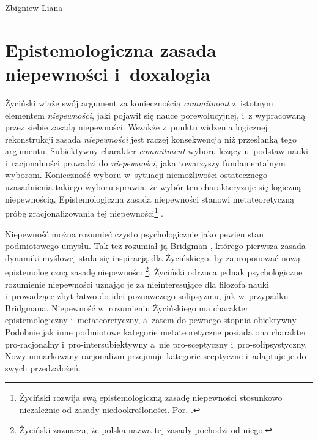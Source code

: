 \begin{artplenv}{Zbigniew Liana}
\section{Epistemologiczna zasada niepewności i~doxalogia}
Życiński wiąże swój argument za koniecznością \textit{commitment} z~istotnym elementem \textit{niepewności}, jaki pojawił się nauce porewolucyjnej, i~z wypracowaną przez siebie zasadą niepewności. Wszakże z~punktu widzenia logicznej rekonstrukcji zasada \textit{niepewności} jest raczej konsekwencją niż przesłanką tego argumentu. Subiektywny charakter \textit{commitment} wyboru leżący u~podstaw nauki i~racjonalności prowadzi do \textit{niepewności}, jaka towarzyszy fundamentalnym wyborom. Konieczność wyboru w~sytuacji niemożliwości ostatecznego uzasadnienia takiego wyboru sprawia, że wybór ten charakteryzuje się logiczną niepewnością. Epistemologiczna zasada niepewności stanowi metateoretyczną próbę zracjonalizowania tej niepewności\footnote{Życiński rozwija swą epistemologiczną zasadę niepewności stosunkowo niezależnie od zasady niedookreśloności. Por.
\parencites[][s.~145]{zycinski_structure_1988}[][s.~256]{zycinski_struktura_2013_liana}.%
} .

Niepewność można rozumieć czysto psychologicznie jako pewien stan podmiotowego umysłu. Tak też rozumiał ją Bridgman
\parencite*[][]{bridgman_reflections_1950}, %
 którego pierwsza zasada dynamiki myślowej stała się inspiracją dla Życińskiego, by zaproponować nową epistemologiczną zasadę niepewności 
\parencites[][s.~158–161]{zycinski_teizm_1985}[][s.~137–139]{zycinski_structure_1988}[][s.~243–247]{zycinski_struktura_2013_liana}%
\footnote{Życiński 
\parencite*[][s.~159, przypis 78]{zycinski_teizm_1985} %
 zaznacza, że polska nazwa tej zasady pochodzi od niego.}. Życiński odrzuca jednak psychologiczne rozumienie niepewności uznając je za nieinteresujące dla filozofa nauki i~prowadzące zbyt łatwo do idei poznawczego solipsyzmu, jak w~przypadku Bridgmana. Niepewność w~rozumieniu Życińskiego ma charakter epistemologiczny i~metateoretyczny, a~zatem do pewnego stopnia obiektywny. Podobnie jak inne podmiotowe kategorie metateoretyczne posiada ona charakter pro-racjonalny i~pro-intersubiektywny a~nie pro-sceptyczny i~pro-solipsystyczny. Nowy umiarkowany racjonalizm przejmuje kategorie sceptyczne i~adaptuje je do swych przedzałożeń.


\end{artplenv}
